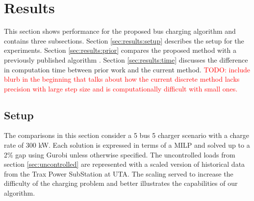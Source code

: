 \section{Results\label{sec:results}}
This section shows performance for the proposed bus charging algorithm and contains three subsections. Section \ref{sec:results:setup} describes the setup for the experiments. Section \ref{sec:results:prior} compares the proposed method with a previously published algorithm \cite{He_2019_Fast}. Section \ref{sec:results:time} discusses the difference in computation time between prior work and the current method.
\textcolor{red}{TODO: include blurb in the beginning that talks about how the current discrete method lacks precision with large step size and is computationally difficult with small ones.}
\subsection{Setup\label{sec:results:setup}}
\par The comparisons in this section consider a 5 bus 5 charger scenario with a charge rate of 300 kW. Each solution is expressed in terms of a MILP and solved up to a 2\% gap using Gurobi \cite{gurobi} unless otherwise specified. The uncontrolled loads from section \ref{sec:uncontrolled} are represented with a scaled version of historical data from the Trax Power SubStation at UTA. The scaling served to increase the difficulty of the charging problem and better illustrates the capabilities of our algorithm. 


